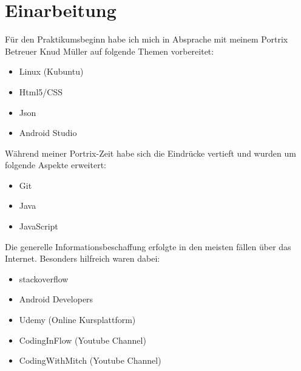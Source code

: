 \newpage
\chapter{Einarbeitung}
F\"ur den Praktikumsbeginn habe ich mich in Absprache mit meinem Portrix Betreuer Knud M\"uller auf folgende Themen vorbereitet:
\begin{itemize}
\item Linux (Kubuntu)
\item Html5/CSS
\item Json
\item Android Studio
\end{itemize}

W\"ahrend meiner Portrix-Zeit habe sich die Eindr\"ucke vertieft und wurden um folgende Aspekte erweitert:

\begin{itemize}
\item Git
\item Java
\item JavaScript
\end{itemize}

Die generelle Informationsbeschaffung erfolgte in den meisten f\"allen \"uber das Internet. Besonders hilfreich waren dabei:

\begin{itemize}
\item stackoverflow
\item Android Developers
\item Udemy (Online Kursplattform)
\item CodingInFlow (Youtube Channel)
\item CodingWithMitch (Youtube Channel)
\end{itemize}


